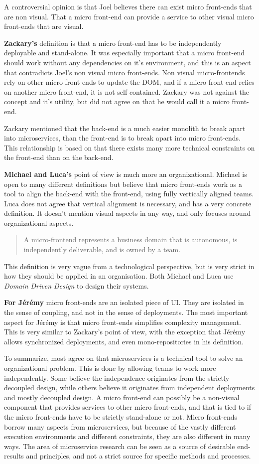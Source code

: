 A controversial opinion is that Joel believes there can exist micro front-ends that are non visual. That a micro front-end can provide a service to other visual micro front-ends that are visual.

\textbf{Zackary's} definition is that a micro front-end has to be independently deployable and stand-alone. It was especially important that a micro front-end should work without any dependencies on it's environment, and this is an aspect that contradicts Joel's non visual micro front-ends. Non visual micro-frontends rely on other micro front-ends to update the \ac{DOM}, and if a micro front-end relies on another micro front-end, it is not self contained. Zackary was not against the concept and it's utility, but did not agree on that he would call it a micro front-end.

Zackary mentioned that the back-end is a much easier monolith to break apart into microservices, than the front-end is to break apart into micro front-ends. This relationship is based on that there exists many more technical constraints on the front-end than on the back-end.

\textbf{Michael and Luca's} point of view is much more an organizational. Michael is open to many different definitions but believe that micro front-ends work as a tool to align the back-end with the front-end, using fully vertically aligned teams. Luca does not agree that vertical alignment is necessary, and has a very concrete definition. It doesn't mention visual aspects in any way, and only focuses around organizational aspects. \blockquote{A micro-frontend represents a business domain that is autonomous, is independently deliverable, and is owned by a team.} This definition is very vague from a technological perspective, but is very strict in how they should be applied in an organisation. Both Michael and Luca use \textit{Domain Driven Design} to design their systems.

\textbf{For J\'er\'emy} micro front-ends are an isolated piece of UI. They are isolated in the sense of coupling, and not in the sense of deployments. The most important aspect for J\'er\'emy is that micro front-ends simplifies complexity management. This is very similar to Zackary's point of view, with the exception that J\'er\'emy allows synchronized deployments, and even mono-repositories in his definition.

To summarize, most agree on that microservices is a technical tool to solve an organizational problem. This is done by allowing teams to work more independently. Some believe the independence originates from the strictly decoupled design, while others believe it originates from independent deployments and mostly decoupled design. A micro front-end can possibly be a non-visual component that provides services to other micro front-ends, and that is tied to if the micro front-ends have to be strictly stand-alone or not. Micro front-ends borrow many aspects from microservices, but because of the vastly different execution environments and different constraints, they are also different in many ways. The area of microservice research can be seen as a source of desirable end-results and principles, and not a strict source for specific methods and processes.

